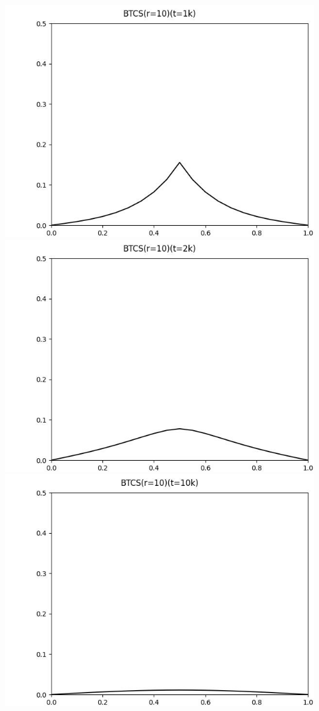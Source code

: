 \documentclass[12pt]{ctexart}
\begin{document}
\includegraphics[scale=0.35]{BTCS(r=10)(t=1k).jpg}
\includegraphics[scale=0.35]{BTCS(r=10)(t=2k).jpg}
\includegraphics[scale=0.35]{BTCS(r=10)(t=10k).jpg}
\end{document}
